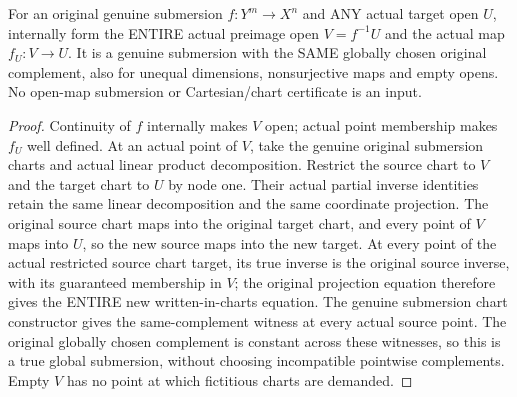 \begin{theorem}
\label{hir:submersion-contact-restriction-whole-open-map}
\leanok
For an original genuine submersion $f:Y^m\to X^n$ and ANY actual target open
$U$, internally form the ENTIRE actual preimage open $V=f^{-1}U$ and the
actual map $f_U:V\to U$. It is a genuine submersion with the SAME globally
chosen original complement, also for unequal dimensions, nonsurjective maps
and empty opens. No open-map submersion or Cartesian/chart certificate is an
input.
\end{theorem}
\begin{proof}
Continuity of $f$ internally makes $V$ open; actual point membership makes
$f_U$ well defined. At an actual point of $V$, take the genuine original
submersion charts and actual linear product decomposition. Restrict the
source chart to $V$ and the target chart to $U$ by node one. Their actual
partial inverse identities retain the same linear decomposition and the
same coordinate projection. The original source chart maps into the original
target chart, and every point of $V$ maps into $U$, so the new source maps
into the new target. At every point of the actual restricted source chart
target, its true inverse is the original source inverse, with its guaranteed
membership in $V$; the original projection equation therefore gives the
ENTIRE new written-in-charts equation. The genuine submersion chart
constructor gives the same-complement witness at every actual source point.
The original globally chosen complement is constant across these witnesses,
so this is a true global submersion, without choosing incompatible pointwise
complements. Empty $V$ has no point at which fictitious charts are demanded.
\end{proof}

